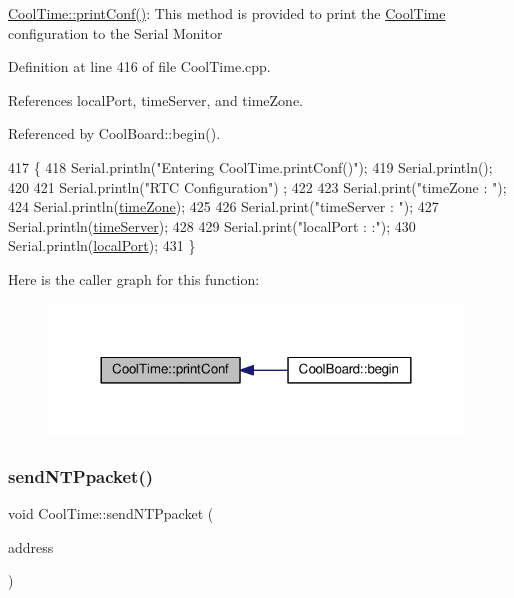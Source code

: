 \hyperlink{classCoolTime_af355e7f9b3898211cd2ff25eab5933b1}{Cool\+Time\+::print\+Conf()}\+: This method is provided to print the \hyperlink{classCoolTime}{Cool\+Time} configuration to the Serial Monitor 

Definition at line 416 of file Cool\+Time.\+cpp.



References local\+Port, time\+Server, and time\+Zone.



Referenced by Cool\+Board\+::begin().


\begin{DoxyCode}
417 \{
418     Serial.println(\textcolor{stringliteral}{"Entering CoolTime.printConf()"});
419     Serial.println();
420 
421     Serial.println(\textcolor{stringliteral}{"RTC Configuration"}) ;
422 
423     Serial.print(\textcolor{stringliteral}{"timeZone : "});
424     Serial.println(\hyperlink{classCoolTime_a1916d98810c2a4e9ba72867e8c1b9a99}{timeZone});
425 
426     Serial.print(\textcolor{stringliteral}{"timeServer : "});
427     Serial.println(\hyperlink{classCoolTime_ad2b9858f399108cb440dd1e908916f04}{timeServer});
428     
429     Serial.print(\textcolor{stringliteral}{"localPort : :"});
430     Serial.println(\hyperlink{classCoolTime_a2f777da44d7ba678be8185299e9b49d1}{localPort});
431 \}
\end{DoxyCode}
Here is the caller graph for this function\+:
\nopagebreak
\begin{figure}[H]
\begin{center}
\leavevmode
\includegraphics[width=312pt]{classCoolTime_af355e7f9b3898211cd2ff25eab5933b1_icgraph}
\end{center}
\end{figure}
\mbox{\label{classCoolTime_a236a38d120dc53bc67456d763838c5a1}} 
\subsubsection{\texorpdfstring{send\+N\+T\+Ppacket()}{sendNTPpacket()}}
{\footnotesize\ttfamily void Cool\+Time\+::send\+N\+T\+Ppacket (\begin{DoxyParamCaption}\item[{I\+P\+Address \&}]{address }\end{DoxyParamCaption})}

